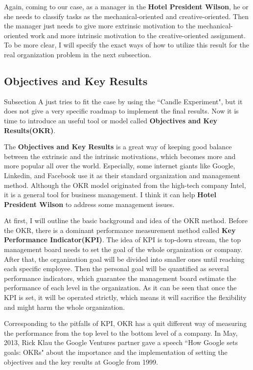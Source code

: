 \documentclass[12pt,onecolumn,a4paper]{IEEEtran}
\begin{document}
Again, coming to our case, as a manager in the \textbf{Hotel President Wilson}, he or she needs to classify tasks as the mechanical-oriented and creative-oriented. Then the manager just needs to give more extrinsic motivation to the mechanical-oriented work and more intrinsic motivation to the creative-oriented assignment. To be more clear, I will specify the exact ways of how to utilize this result for the real organization problem in the next subsection.

\subsection{\textbf{Objectives and Key Results}}
Subsection A just tries to fit the case by using the ``Candle Experiment", but it does not give a very specific roadmap to implement the final results. Now it is time to introduce an useful tool or model called \textbf{Objectives and Key Results(OKR)}. 

The \textbf{Objectives and Key Results} is a great way of keeping good balance between the extrinsic and the intrinsic motivations, which becomes more and more popular all over the world. Especially, some internet giants like Google, Linkedin, and Facebook use it as their standard organization and management method. Although the OKR model originated from the high-tech company Intel, it is a general tool for business management. I think it can help \textbf{Hotel President Wilson} to address some management issues. 

At first, I will outline the basic background and idea of the OKR method. Before the OKR, there is a dominant performance measurement method called \textbf{Key Performance Indicator(KPI)}. The idea of KPI is top-down stream, the top management board needs to set the goal of the whole organization or company. After that, the organization goal will be divided into smaller ones until reaching each specific employee. Then the personal goal will be quantified as several performance indicators, which guarantee the management board estimate the performance of each level in the organization. As it can be seen that once the KPI is set, it will be operated strictly, which means it will sacrifice the flexibility and might harm the whole organization. 

Corresponding to the pitfalls of KPI, OKR has a quit different way of measuring the performance from the top level to the bottom level of a company. In May, 2013, Rick Klau the Google Ventures partner gave a speech ``How Google sets goals: OKRs"\cite{OKRGV} about the importance and the implementation of setting the objectives and the key results at Google from 1999. 
\end{document}
